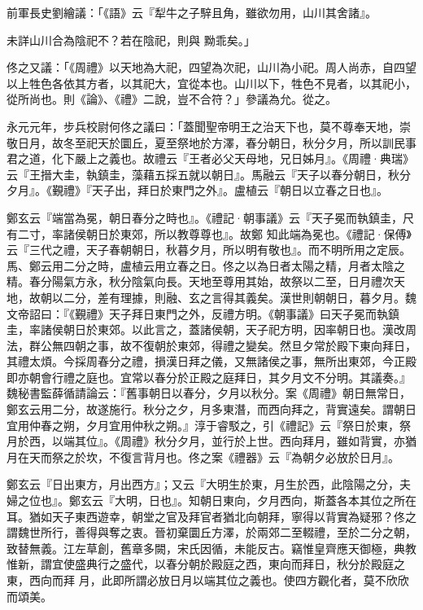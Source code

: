 \begin{pinyinscope}
 前軍長史劉繪議：「《語》云『犁牛之子騂且角，雖欲勿用，山川其舍諸』。



 未詳山川合為陰祀不？若在陰祀，則與
 黝乖矣。」



 佟之又議：「《周禮》以天地為大祀，四望為次祀，山川為小祀。周人尚赤，自四望以上牲色各依其方者，以其祀大，宜從本也。山川以下，牲色不見者，以其祀小，從所尚也。則《論》、《禮》二說，豈不合符？」參議為允。從之。



 永元元年，步兵校尉何佟之議曰：「蓋聞聖帝明王之治天下也，莫不尊奉天地，崇敬日月，故冬至祀天於圜丘，夏至祭地於方澤，春分朝日，秋分夕月，所以訓民事君之道，化下嚴上之義也。故禮云『王者必父天母地，兄日姊月』。《周禮·典瑞》云『王搢大圭，執鎮圭，藻藉五採五就以朝日』。馬融云『天子以春分朝日，秋分夕月』。《覲禮》『天子出，拜日於東門之外』。盧植云『朝日以立春之日也』。



 鄭玄云『端當為冕，朝日春分之時也』。《禮記·朝事議》云『天子冕而執鎮圭，尺有二寸，率諸侯朝日於東郊，所以教尊尊也』。故鄭
 知此端為冕也。《禮記·保傅》云『三代之禮，天子春朝朝日，秋暮夕月，所以明有敬也』。而不明所用之定辰。馬、鄭云用二分之時，盧植云用立春之日。佟之以為日者太陽之精，月者太陰之精。春分陽氣方永，秋分陰氣向長。天地至尊用其始，故祭以二至，日月禮次天地，故朝以二分，差有理據，則融、玄之言得其義矣。漢世則朝朝日，暮夕月。魏文帝詔曰：『《覲禮》天子拜日東門之外，反禮方明。《朝事議》曰天子冕而執鎮圭，率諸侯朝日於東郊。以此言之，蓋諸侯朝，天子祀方明，因率朝日也。漢改周法，群公無四朝之事，故不復朝於東郊，得禮之變矣。然旦夕常於殿下東向拜日，其禮太煩。今採周春分之禮，損漢日拜之儀，又無諸侯之事，無所出東郊，今正殿即亦朝會行禮之庭也。宜常以春分於正殿之庭拜日，其夕月文不分明。其議奏。』魏秘書監薛循請論云：『舊事朝日以春分，夕月以秋分。案《周禮》朝日無常日，
 鄭玄云用二分，故遂施行。秋分之夕，月多東潛，而西向拜之，背實遠矣。謂朝日宜用仲春之朔，夕月宜用仲秋之朔。』淳于睿駁之，引《禮記》云『祭日於東，祭月於西，以端其位』。《周禮》秋分夕月，並行於上世。西向拜月，雖如背實，亦猶月在天而祭之於坎，不復言背月也。佟之案《禮器》云『為朝夕必放於日月』。



 鄭玄云『日出東方，月出西方』；又云『大明生於東，月生於西，此陰陽之分，夫婦之位也』。鄭玄云『大明，日也』。知朝日東向，夕月西向，斯蓋各本其位之所在耳。猶如天子東西遊幸，朝堂之官及拜官者猶北向朝拜，寧得以背實為疑邪？佟之謂魏世所行，善得與奪之衷。晉初棄圜丘方澤，於兩郊二至輟禮，至於二分之朝，致替無義。江左草創，舊章多闕，宋氏因循，未能反古。竊惟皇齊應天御極，典教惟新，謂宜使盛典行之盛代，以春分朝於殿庭之西，東向而拜日，秋分於殿庭之東，西向而拜
 月，此即所謂必放日月以端其位之義也。使四方觀化者，莫不欣欣而頌美。




\end{pinyinscope}
